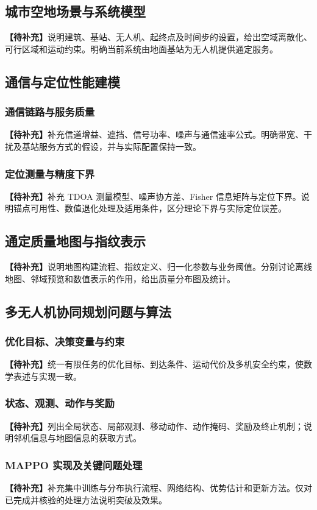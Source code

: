\documentclass[UTF8,a4paper,12pt,fontset=fandol]{ctexart}
\newcommand{\pending}[1]{\par\noindent\textbf{【待补充】}#1\par}
\begin{document}
\subsection{城市空地场景与系统模型}
\pending{说明建筑、基站、无人机、起终点及时间步的设置，给出空域离散化、可行区域和运动约束。明确当前系统由地面基站为无人机提供通定服务。}

\subsection{通信与定位性能建模}
\subsubsection{通信链路与服务质量}
\pending{补充信道增益、遮挡、信号功率、噪声与通信速率公式。明确带宽、干扰及基站服务方式的假设，并与实际配置保持一致。}
\subsubsection{定位测量与精度下界}
\pending{补充 TDOA 测量模型、噪声协方差、Fisher 信息矩阵与定位下界。说明锚点可用性、数值退化处理及适用条件，区分理论下界与实际定位误差。}

\subsection{通定质量地图与指纹表示}
\pending{说明地图构建流程、指纹定义、归一化参数与业务阈值。分别讨论离线地图、邻域预览和数值表示的作用，给出质量分布图及统计。}

\subsection{多无人机协同规划问题与算法}
\subsubsection{优化目标、决策变量与约束}
\pending{统一有限任务的优化目标、到达条件、运动代价及多机安全约束，使数学表述与实现一致。}
\subsubsection{状态、观测、动作与奖励}
\pending{列出全局状态、局部观测、移动动作、动作掩码、奖励及终止机制；说明邻机信息与地图信息的获取方式。}
\subsubsection{MAPPO 实现及关键问题处理}
\pending{补充集中训练与分布执行流程、网络结构、优势估计和更新方法。仅对已完成并核验的处理方法说明突破及效果。}
\end{document}
